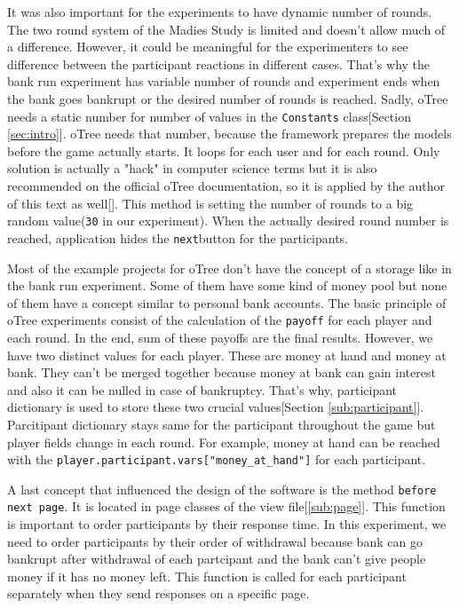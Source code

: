 It was also important for the experiments to have dynamic number of rounds. The two round system of the Madies Study is limited and doesn't allow much of a difference. However, it could be meaningful for the experimenters to see difference between the participant reactions in different cases. That's why the bank run experiment has variable number of rounds and experiment ends when the bank goes bankrupt or the desired number of rounds is reached. Sadly, oTree needs a static number for number of values in the \verb|Constants| class[Section \ref{sec:intro}]. oTree needs that number, because the framework prepares the models before the game actually starts. It loops for each user and for each round. Only solution is actually a "hack" in computer science terms but it is also recommended on the official oTree documentation, so it is applied by the author of this text as well[\cite{oTreeModel2017}]. This method is setting the number of rounds to a big random value(\verb|30| in our experiment). When the actually desired round number is reached, application hides the \verb|next|button for the participants.

Most of the example projects for oTree don't have the concept of a storage like in the bank run experiment. Some of them have some kind of money pool but none of them have a concept similar to personal bank accounts. The basic principle of oTree experiments consist of the calculation of the \verb|payoff| for each player and each round. In the end, sum of these payoffs are the final results. However, we have two distinct values for each player. These are money at hand and money at bank. They can't be merged together because money at bank can gain interest and also it can be nulled in case of bankruptcy. That's why, participant dictionary is used to store these two crucial values[Section \ref{sub:participant}]. Parcitipant dictionary stays same for the participant throughout the game but player fields change in each round. For example, money at hand can be reached with the \verb|player.participant.vars["money_at_hand"]| for each participant.

A last concept that influenced the design of the software is the method \verb|before next page|. It is located in page classes of the view file[\ref{sub:page}]. This function is important to order participants by their response time. In this experiment, we need to order participants by their order of withdrawal because bank can go bankrupt after withdrawal of each partcipant and the bank can't give people money if it has no money left. This function is called for each participant separately when they send responses on a specific page.

